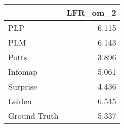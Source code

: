 \begin{tabular}{lr}
\toprule
{} & LFR_om_2 \\
\midrule
PLP          &    6.115 \\
PLM          &    6.143 \\
Potts        &    3.896 \\
Infomap      &    5.061 \\
Surprise     &    4.436 \\
Leiden       &    6.545 \\
Ground Truth &    5.337 \\
\bottomrule
\end{tabular}
